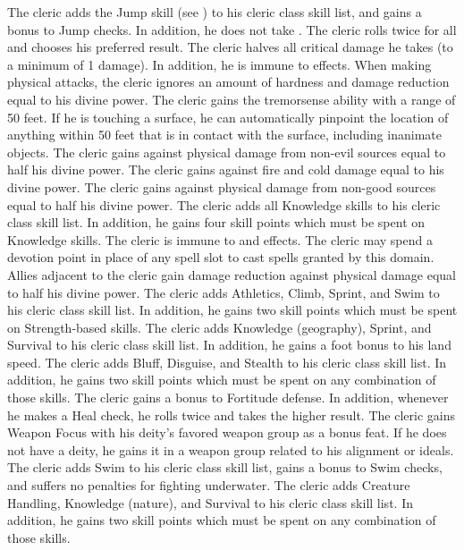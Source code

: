 The cleric adds the Jump skill (see ) to his cleric class skill list, and gains a  bonus to Jump checks.
In addition, he does not take .
The cleric rolls twice for all  and chooses his preferred result.
The cleric halves all critical damage he takes (to a minimum of 1 damage).
In addition, he is immune to  effects.
When making physical attacks, the cleric ignores an amount of hardness and damage reduction equal to his divine power.
The cleric gains the tremorsense ability with a range of 50 feet.
If he is touching a surface, he can automatically pinpoint the location of anything within 50 feet that is in contact with the surface, including inanimate objects.
The cleric gains  against physical damage from non-evil sources equal to half his divine power.
The cleric gains  against fire and cold damage equal to his divine power.
The cleric gains  against physical damage from non-good sources equal to half his divine power.
The cleric adds all Knowledge skills to his cleric class skill list.
In addition, he gains four skill points which must be spent on Knowledge skills.
The cleric is immune to  and  effects.
The cleric may spend a devotion point in place of any spell slot to cast spells granted by this domain.
Allies adjacent to the cleric gain damage reduction against physical damage equal to half his divine power.
The cleric adds Athletics, Climb, Sprint, and Swim to his cleric class skill list.
In addition, he gains two skill points which must be spent on Strength-based skills.
The cleric adds Knowledge (geography), Sprint, and Survival to his cleric class skill list.
In addition, he gains a  foot bonus to his land speed.
The cleric adds Bluff, Disguise, and Stealth to his cleric class skill list.
In addition, he gains two skill points which must be spent on any combination of those skills.
The cleric gains a  bonus to Fortitude defense.
In addition, whenever he makes a Heal check, he rolls twice and takes the higher result.
The cleric gains Weapon Focus with his deity's favored weapon group as a bonus feat.
If he does not have a deity, he gains it in a weapon group related to his alignment or ideals.
The cleric adds Swim to his cleric class skill list, gains a  bonus to Swim checks, and suffers no penalties for fighting underwater.
The cleric adds Creature Handling, Knowledge (nature), and Survival to his cleric class skill list.
In addition, he gains two skill points which must be spent on any combination of those skills.

